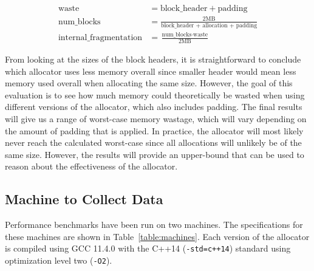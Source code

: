 \begin{align}
    \text{waste} &= \text{block\_header} + \text{padding} \\
    \text{num\_blocks} &= \frac{2\text{MB}}{\text{block\_header + allocation + padding}} \\
    \text{internal\_fragmentation} &= \frac{\text{num\_blocks} \cdot \text{waste}}{2\text{MB}}
\end{align}

From looking at the sizes of the block headers, it is straightforward to conclude which allocator uses less memory overall since smaller header would mean less memory used overall when allocating the same size. However, the goal of this evaluation is to see how much memory could theoretically be wasted when using different versions of the allocator, which also includes padding. The final results will give us a range of worst-case memory wastage, which will vary depending on the amount of padding that is applied. In practice, the allocator will most likely never reach the calculated worst-case since all allocations will unlikely be of the same size. However, the results will provide an upper-bound that can be used to reason about the effectiveness of the allocator.

\subsection{Machine to Collect Data}

Performance benchmarks have been run on two machines. The specifications for these machines are shown in Table~\ref{table:machines}. Each version of the allocator is compiled using GCC 11.4.0 with the C++14 (\texttt{-std=c++14}) standard using optimization level two (\texttt{-O2}).

